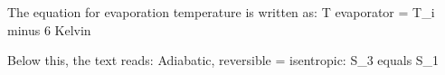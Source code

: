 The equation for evaporation temperature is written as:  
T evaporator = T_i minus 6 Kelvin  

Below this, the text reads:  
Adiabatic, reversible = isentropic: S_3 equals S_1
